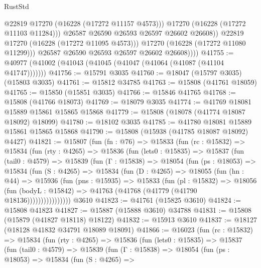 \begin{lexlean}{RustStd}
\begin{coremodule}
                        @22819
                        @17270
                        (@16228 (@17272 @11157 @4573)))
                      @17270
                      (@16228 (@17272 @11103 @11284)))
                    @26587
                    @26590
                    @26593
                    @26597
                    @26602
                    @26608))
                @22819
                @17270
                (@16228 (@17272 @11095 @4573)))
              @17270
              (@16228 (@17272 @11080 @11299)))
            @26587
            @26590
            @26593
            @26597
            @26602
            @26608))))
@41755 := @40977 (@41002 (@41043 (@41045 (@41047 (@41064 (@41087 (@41104 @41747)))))))
@41756 := @15791 @3035
@41760 := @18047 (@15797 @3035) (@15803 @3035)
@41761 := @15812 @34785
@41763 := @15808 (@41761 @18059)
@41765 := @15850 (@15851 @3035)
@41766 := @15846 @41765
@41768 := @15808 (@41766 @18073)
@41769 := @18079 @3035
@41774 := @41769 @18081 @15889 @15861 @15865 @15868
@41779 := @15808 (@18078 (@41774 @18087 @18092) @18099)
@41780 := @18102 @3035
@41785 := @41780 @18081 @15889 @15861 @15865 @15868
@41790 := @15808 (@15938 (@41785 @18087 @18092) @4427)
@41821 := @15807
    (fun (fn : @76) =>
    @15833
      (fun (rc : @15832) =>
      @15834
        (fun (rty : @4265) =>
        @15836
          (fun (lets0 : @15835) =>
          @15837
            (fun (tail0 : @4579) =>
            @15839
              (fun (Γ : @15838) =>
              @18054
                (fun (ps : @18053) =>
                @15834
                  (fun (S : @4265) =>
                  @15834
                    (fun (D : @4265) =>
                    @18055
                      (fun (hn : @44) =>
                      @15936
                        (fun (pns : @15935) =>
                        @15833
                          (fun (pl : @15832) =>
                          @18056
                            (fun (bodyL : @15842) =>
                            @41763 (@41768 (@41779 (@41790 @18136))))))))))))))))
    @3610
@41823 := @41761 (@15825 @3610)
@41824 := @15808 @41823
@41827 := @15887 (@15888 @3610) @34788
@41831 := @15808 (@15879 (@41827 @18118) @18122)
@41832 := @15913 @3610
@41837 := @18127 (@18128 @41832 @34791 @18089 @18091)
@41866 := @16023
    (fun (rc : @15832) =>
    @15834
      (fun (rty : @4265) =>
      @15836
        (fun (lets0 : @15835) =>
        @15837
          (fun (tail0 : @4579) =>
          @15839
            (fun (Γ : @15838) =>
            @18054
              (fun (ps : @18053) =>
              @15834
                (fun (S : @4265) =>

\end{coremodule}
\end{lexlean}
